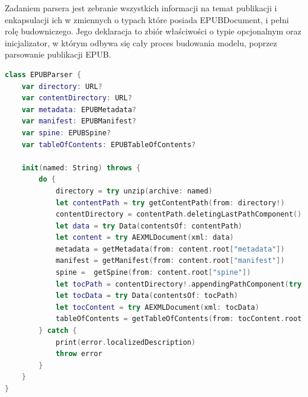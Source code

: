 Zadaniem parsera jest zebranie wszystkich informacji na temat publikacji i enkapsulacji ich w zmiennych o typach które posiada EPUBDocument, i pełni rolę budowniczego. Jego deklaracja to zbiór właściwości o typie opcjonalnym oraz inicjalizator, w którym odbywa się cały proces budowania modelu, poprzez parsowanie publikacji EPUB.

\begin{lstlisting}[caption={Klasa EPUBParser.}, language=swift]
class EPUBParser {
    var directory: URL?
    var contentDirectory: URL?
    var metadata: EPUBMetadata?
    var manifest: EPUBManifest?
    var spine: EPUBSpine?
    var tableOfContents: EPUBTableOfContents?

    init(named: String) throws {
        do {
            directory = try unzip(archive: named)
            let contentPath = try getContentPath(from: directory!)
            contentDirectory = contentPath.deletingLastPathComponent()
            let data = try Data(contentsOf: contentPath)
            let content = try AEXMLDocument(xml: data)
            metadata = getMetadata(from: content.root["metadata"])
            manifest = getManifest(from: content.root["manifest"])
            spine =  getSpine(from: content.root["spine"])
            let tocPath = contentDirectory!.appendingPathComponent(try manifest!.path(forItemWithId: spine?.toc ?? ""))
            let tocData = try Data(contentsOf: tocPath)
            let tocContent = try AEXMLDocument(xml: tocData)
            tableOfContents = getTableOfContents(from: tocContent.root)
        } catch {
            print(error.localizedDescription)
            throw error
        }
    }
}
\end{lstlisting}

